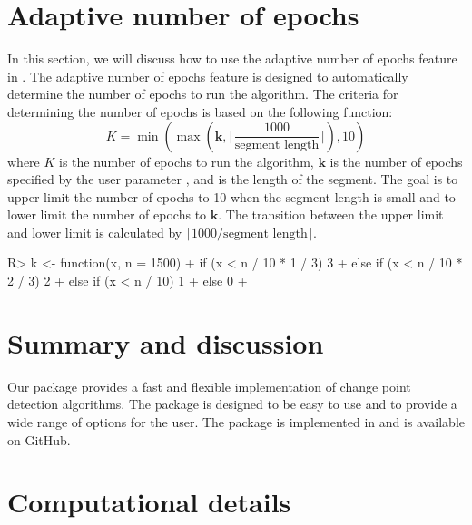 \documentclass[article]{jss}
\begin{document}
\section{Adaptive number of epochs} \label{sec:adaptive number of epochs}

In this section, we will discuss how to use the adaptive number of epochs
feature in . The adaptive number of epochs feature is designed to
automatically determine the number of epochs to run the algorithm. The criteria
for determining the number of epochs is based on the following function:
%
\begin{equation} \label{eq:adaptive number of epochs}
  K = \min(\max(\boldsymbol{k}, \lceil \frac{1000}{\text{segment length}} \rceil), 10)
\end{equation}
%
where $K$ is the number of epochs to run the algorithm, $\boldsymbol{k}$ is the
number of epochs specified by the user parameter , and  is the
length of the segment. The goal is to upper limit the number of epochs to 10
when the segment length is small and to lower limit the number of epochs to
$\boldsymbol{k}$. The transition between the upper limit and lower limit is
calculated by $\lceil 1000 / \text{segment length} \rceil$.

\begin{Schunk}
\begin{Sinput}
R> k <- function(x, n = 1500) {
+    if (x < n / 10 * 1 / 3) 3
+    else if (x < n / 10 * 2 / 3) 2
+    else if (x < n / 10) 1
+    else 0
+  }
\end{Sinput}
\end{Schunk}


\section{Summary and discussion} \label{sec:summary}

Our package  provides a fast and flexible implementation of
change point detection algorithms. The package is designed to be easy to use
and to provide a wide range of options for the user. The package is
implemented in  and is available on GitHub.



\section*{Computational details}
\end{document}
